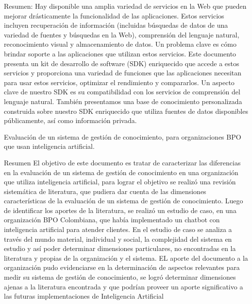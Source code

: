 Resumen:
Hay disponible una amplia variedad de servicios en la Web que pueden mejorar drásticamente la funcionalidad de las aplicaciones. Estos servicios incluyen recuperación de información (incluidas búsquedas de datos de una variedad de fuentes y búsquedas en la Web), comprensión del lenguaje natural, reconocimiento visual y almacenamiento de datos. Un problema clave es cómo brindar soporte a las aplicaciones que utilizan estos servicios. Este documento presenta un kit de desarrollo de software (SDK) enriquecido que accede a estos servicios y proporciona una variedad de funciones que las aplicaciones necesitan para usar estos servicios, optimizar el rendimiento y compararlos. Un aspecto clave de nuestro SDK es su compatibilidad con los servicios de comprensión del lenguaje natural. También presentamos una base de conocimiento personalizada construida sobre nuestro SDK enriquecido que utiliza fuentes de datos disponibles públicamente, así como información privada.
 
Evaluación de un sistema de gestión de conocimiento, para organizaciones BPO que usan
inteligencia artificial.
 
Resumen El objetivo de este documento es tratar de caracterizar las diferencias en la evaluación de un sistema de gestión de conocimiento en una organización que utiliza inteligencia artificial, para lograr el objetivo se realizó una revisión sistemática de literatura, que pudiera dar cuenta de las dimensiones características de la evaluación de un sistema de gestión de conocimiento. Luego de identificar los aportes de la literatura, se realizó un estudio de caso, en una organización BPO Colombiana, que había implementado un chatbot con inteligencia artificial para atender clientes. En el estudio de caso se analiza a través del mundo material, individual y social, la complejidad del sistema en estudio y así poder determinar dimensiones particulares, no encontradas en la literatura y propias de la organización y el sistema. EL aporte del documento a la organización pudo evidenciarse en la determinación de aspectos relevantes para medir su sistema de gestión de conocimiento, se logró determinar dimensiones ajenas a la literatura encontrada y que podrían proveer un aporte significativo a las futuras implementaciones de Inteligencia Artificial
